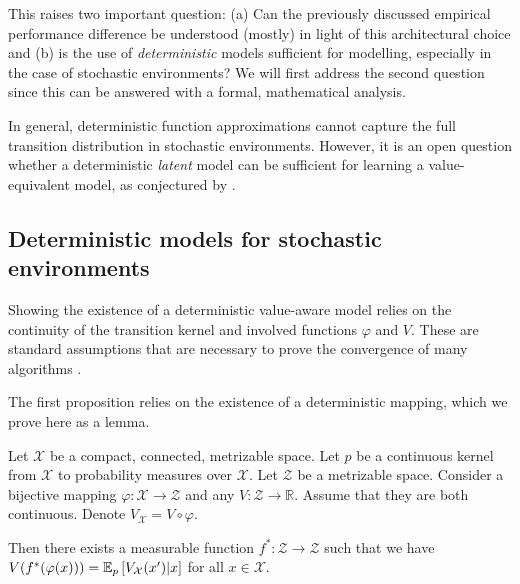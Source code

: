 This raises two important question: (a) Can the previously discussed empirical performance difference be understood (mostly) in light of this architectural choice and (b) is the use of \emph{deterministic} models sufficient for modelling, especially in the case of stochastic environments?
We will first address the second question since this can be answered with a formal, mathematical analysis. 

In general, deterministic function approximations cannot capture the full transition distribution in stochastic environments.
However, it is an open question whether a deterministic \emph{latent} model can be sufficient for learning a value-equivalent model, as conjectured by \textcite{oh2017value}.

\subsection{Deterministic models for stochastic environments}

Showing the existence of a deterministic value-aware model relies on the continuity of the transition kernel and involved functions $\varphi$ and $V$.
These are standard assumptions that are necessary to prove the convergence of many algorithms \parencite{bertsekasshreve1978}. 


The first proposition relies on the existence of a deterministic mapping, which we prove here as a lemma.


\begin{lemma}
\label{lem:cvaml:deterministic_representation_lemma}
    Let $\mathcal{X}$ be a compact, connected, metrizable space. Let $p$ be a continuous kernel from $\mathcal{X}$ to probability measures over $\mathcal{X}$. Let $\mathcal{Z}$ be a metrizable space. Consider a bijective mapping $\varphi: \mathcal{X} \rightarrow \mathcal{Z}$ and any $V: \mathcal{Z} \rightarrow \mathbb{R}$. Assume that they are both continuous. Denote $V_\mathcal{X} = V \circ \varphi$.
    
    Then there exists a measurable function $f^*: \mathcal{Z} \rightarrow \mathcal{Z}$ such that we have $V(f^*(\varphi(x))) = \mathbb{E}_{p}\left[  V_\mathcal{X}(x')|x \right]$ for all $x \in \mathcal{X}$.
\end{lemma}


